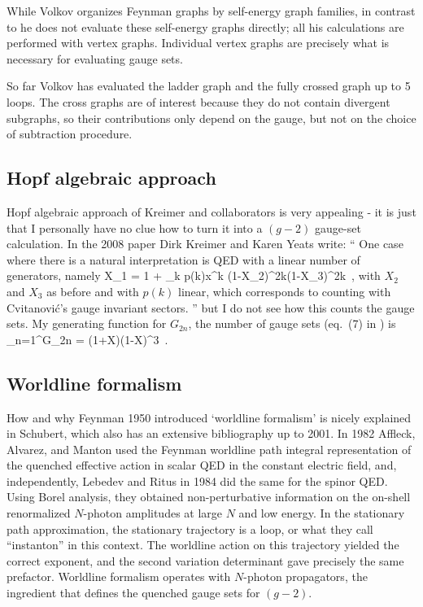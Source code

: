 While Volkov organizes Feynman graphs by self-energy graph families, in
contrast to  he does
not evaluate these self-energy graphs directly;
all his calculations are performed with vertex graphs. Individual  vertex
graphs are precisely what is  necessary for evaluating gauge sets.

So far Volkov  has evaluated the ladder graph
and the fully crossed graph
up to 5 loops. The cross graphs are of interest because they do not
contain divergent subgraphs, so their contributions only depend on the
gauge, but not on the choice of subtraction procedure.

\subsection{Hopf algebraic approach}
\label{sect:HopfAlgebra}

Hopf algebraic approach of Kreimer and collaborators is very appealing - it is just that I
personally have no clue how to turn it into a $(g-2)$ gauge-set
calculation. In the 2008 paper Dirk Kreimer and
{Karen Yeats} write: ``
One case where there is a natural interpretation is QED with a linear number of
generators, namely
\beq
X_1 = 1 + \sum_{k }p(k)x^k
           {(1-X_2)^{2k}(1-X_3)^{2k}}
\,,
with $X_2$ and $X_3$ as before and with $p(k)$ linear, which corresponds
to counting with Cvitanovi\'c's gauge invariant sectors.
''
but I do not see how this counts the gauge sets. My
generating function for $G_{2n}$, the number of gauge sets
(eq.~(7) in )  is
\beq
\sum_{n=1}^\infty G_{2n}
    =
           {(1+X)(1-X)^{3}}
\,.



\subsection{Worldline formalism}
\label{sect:worldline}

How and why Feynman 1950 introduced `worldline formalism'
is nicely explained in Schubert, which also has an
extensive bibliography up to 2001.
In 1982 Affleck, Alvarez, and Manton used the
Feynman worldline path integral representation of the
quenched effective action in scalar QED in the constant electric field,
and, independently, Lebedev and Ritus in 1984 did the same
for the spinor QED. Using Borel analysis, they obtained non-perturbative
information on the on-shell renormalized $N$-photon amplitudes at large
$N$ and low energy. In the stationary path approximation, the stationary
trajectory is a loop, or what they call ``instanton''  in this context.
The worldline action on this trajectory yielded the correct exponent, and
the second variation determinant gave precisely the same prefactor.
Worldline formalism operates with $N$-photon propagators, the ingredient
that defines the quenched gauge sets for $(g-2)$.

